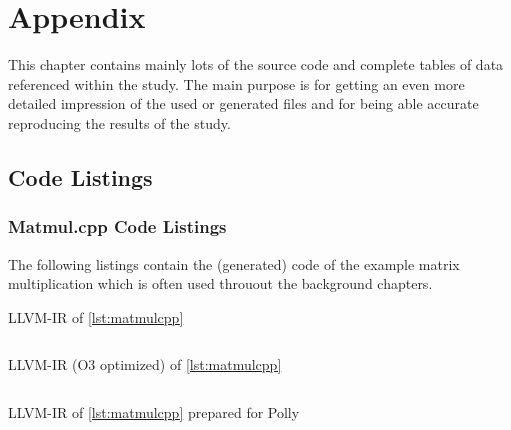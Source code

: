 \chapter{Appendix}
This chapter contains mainly lots of the source code and complete tables of data referenced within the study.
The main purpose is for getting an even more detailed impression of the used or generated files and for being able accurate reproducing the results of the study.

\section{Code Listings}
\subsection{Matmul.cpp Code Listings}
The following listings contain the (generated) code of the example matrix multiplication which is often used throuout the background chapters.
\begin{code}
    \caption{LLVM-IR of \autoref{lst:matmulcpp}}
    \inputminted{LLVM}{ll/matmul.ll}
    \label{lst:matmulll}
\end{code}
\begin{code}
    \caption{LLVM-IR (O3 optimized) of \autoref{lst:matmulcpp}}
    \inputminted{LLVM}{ll/matmulO3.ll}
    \label{lst:matmulllO3}
\end{code}
\begin{code}
    \caption{LLVM-IR of \autoref{lst:matmulcpp} prepared for Polly}
    \inputminted{LLVM}{ll/matmul.preopt.ll}
    \label{lst:matmulpreoptll}
\end{code}


